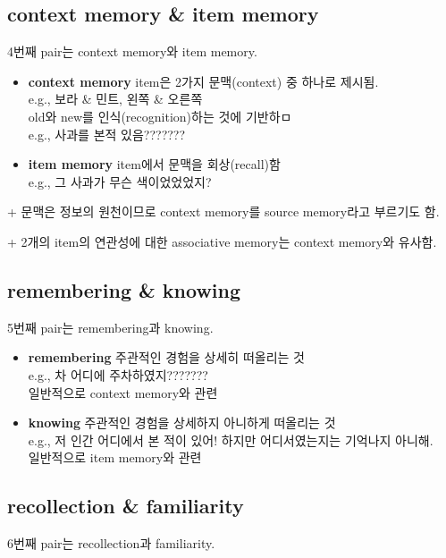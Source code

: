 \documentclass[../note.tex]{subfiles}
\begin{document}
\subsection{context memory \& item memory}
4번째 pair는 context memory와 item memory.

\begin{itemize}
  \item{\textbf{context memory}}
    item은 2가지 문맥(context) 중 하나로 제시됨.\\
    e.g., 보라 \& 민트, 왼쪽 \& 오른쪽\\
    old와 new를 인식(recognition)하는 것에 기반하ㅁ\\
    e.g., 사과를 본적 있음???????
  \item{\textbf{item memory}}
    item에서 문맥을 회상(recall)함\\
    e.g., 그 사과가 무슨 색이었었었지?
\end{itemize}

+ 문맥은 정보의 원천이므로 context memory를 source memory라고 부르기도 함.

+ 2개의 item의 연관성에 대한 associative memory는 context memory와 유사함.

\subsection{remembering \& knowing}
5번째 pair는 remembering과 knowing.

\begin{itemize}
  \item{\textbf{remembering}}
    주관적인 경험을 상세히 떠올리는 것\\
    e.g., 차 어디에 주차하였지???????\\
    일반적으로 context memory와 관련
  \item{\textbf{knowing}}
    주관적인 경험을 상세하지 아니하게 떠올리는 것\\
    e.g., 저 인간 어디에서 본 적이 있어! 하지만 어디서였는지는 기억나지 아니해.\\
    일반적으로 item memory와 관련
\end{itemize}

\subsection{recollection \& familiarity}
6번째 pair는 recollection과 familiarity.
\end{document}
